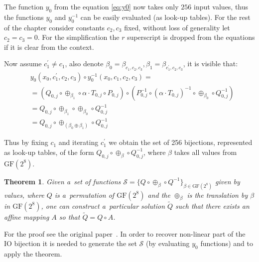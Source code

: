 \documentclass[11pt,oneside,final]{fithesis2}
\newtheorem{mytheorem}{Theorem}
\newcommand{\gfe}{\ensuremath{\text{GF}\left(2^8\right)}}
\begin{document}
    The function $y_0$ from the equation \ref{eq:y0} now takes only $256$ input values, thus the functions $y_0$ and $y_0^{-1}$ 
    can be easily evaluated (as look-up tables). For the rest of the chapter consider constants $c_2, c_3$ fixed, without loss 
    of generality let $c_2=c_3=0$. For the simplification the $r$ superscript is dropped from the 
    equations if it is clear from the context.

    Now assume $c^{\prime}_1 \neq c_1$, also denote $\beta_{0} = \beta_{c_1,c_2,c_3}, \beta_{1} = \beta_{c^{\prime}_1,c_2,c_3}$, it is visible that:
    \begin{subequations}
     \begin{align}
     & y_0\left(x_0, c^{\prime}_1, c_2, c_3 \right) \circ y_0^{-1}\left(x_0, c_1, c_2, c_3 \right) = \nonumber \\
     &=           \left( Q_{0,j}      \circ \oplus_{\beta_1}                         \circ \alpha \cdot T_{0,j}    \circ P_{0,j}     \right) \nonumber
	\circ     \left( P^{-1}_{0,j} \circ \left(\alpha \cdot T_{0,j}\right)^{-1}   \circ \oplus_{\beta_0}        \circ Q^{-1}_{0,j}\right) \nonumber \\
     &= Q_{0,j} \circ \oplus_{\beta_1} \circ \oplus_{\beta_0} \circ Q^{-1}_{0,j}                                                             \nonumber \\
     &= Q_{0,j} \circ \oplus_{\left(\beta_0 \oplus \beta_1\right)} \circ Q^{-1}_{0,j}                                                        \nonumber
     \end{align}
    \end{subequations}

    Thus by fixing $c_1$ and iterating $c^{\prime}_1$ we obtain the set of 256 bijections, represented as look-up tables, 
    of the form $Q_{0,j} \circ \oplus_{\beta} \circ Q^{-1}_{0,j}$, where $\beta$ takes all values from $\gfe$.
    
    \begin{mytheorem}\label{prop:bge1}
     Given a~set of functions $\mathcal{S} = \{Q \circ \oplus_{\beta} \circ Q^{-1}\}_{\beta \in \gfe}$ given by values, 
     where $Q$ is a~permutation of $\gfe$ and the $\oplus_{\beta}$ is the translation by $\beta$ in $\gfe$, one can construct a~particular
     solution $\widetilde{Q}$ such that there exists an affine mapping $A$ so that $\widetilde{Q} = Q \circ A$.
    \end{mytheorem}
    
    For the proof see the original paper~\citep{Billet:2004:CWB:2080787.2080809}. In order to recover non-linear part of the IO bijection it is needed to generate
    the set $\mathcal{S}$ (by evaluating $y_0$ functions) and to apply the theorem.
    
\end{document}
